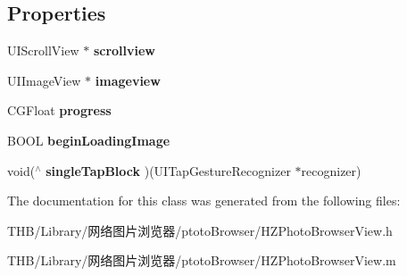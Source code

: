 \subsection*{Properties}
\begin{DoxyCompactItemize}
\item 
\mbox{\label{interface_h_z_photo_browser_view_a1a19cec501f8d4d621d80331d8077833}} 
U\+I\+Scroll\+View $\ast$ {\bfseries scrollview}
\item 
\mbox{\label{interface_h_z_photo_browser_view_a510a8006af4ecc163752f4ffebb0c0b7}} 
U\+I\+Image\+View $\ast$ {\bfseries imageview}
\item 
\mbox{\label{interface_h_z_photo_browser_view_a4aa4f36aa55aa81c7b4ce19c341f422d}} 
C\+G\+Float {\bfseries progress}
\item 
\mbox{\label{interface_h_z_photo_browser_view_a46f8a75ce0275cbeb91109a96d47b828}} 
B\+O\+OL {\bfseries begin\+Loading\+Image}
\item 
\mbox{\label{interface_h_z_photo_browser_view_a952622486743d25b0a8de585a5c19e6b}} 
void($^\wedge$ {\bfseries single\+Tap\+Block} )(U\+I\+Tap\+Gesture\+Recognizer $\ast$recognizer)
\end{DoxyCompactItemize}


The documentation for this class was generated from the following files\+:\begin{DoxyCompactItemize}
\item 
T\+H\+B/\+Library/网络图片浏览器/ptoto\+Browser/H\+Z\+Photo\+Browser\+View.\+h\item 
T\+H\+B/\+Library/网络图片浏览器/ptoto\+Browser/H\+Z\+Photo\+Browser\+View.\+m\end{DoxyCompactItemize}
